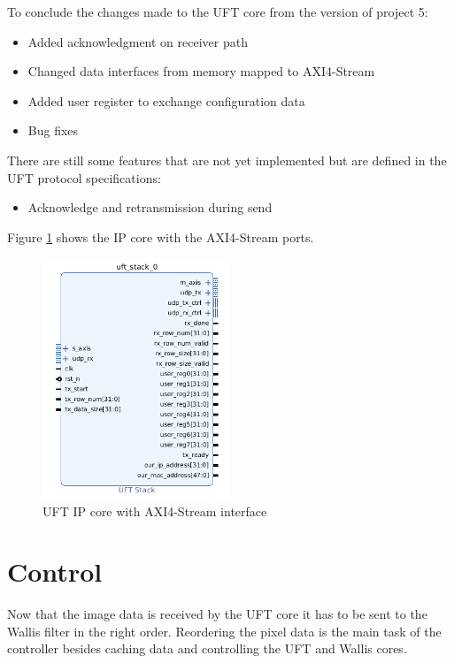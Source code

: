 To conclude the changes made to the UFT core from the version of project 5:
\begin{itemize}
  \item Added acknowledgment on receiver path
  \item Changed data interfaces from memory mapped to AXI4-Stream
  \item Added user register to exchange configuration data
  \item Bug fixes
\end{itemize}

There are still some features that are not yet implemented but are defined in
the UFT protocol specifications:
\begin{itemize}
  \item Acknowledge and retransmission during send
\end{itemize}

Figure \ref{fig:uftipcoreaxistream} shows the IP core with the AXI4-Stream
ports.

\begin{figure}[b!]
    \centering
    \includegraphics[width=0.5\textwidth] {images/dataflow/uftcorestream.png}
    \caption{UFT IP core with AXI4-Stream interface}
    \label{fig:uftipcoreaxistream}
\end{figure}
\section{Control} \label{ch:control}
Now that the image data is received by the UFT core it has to be sent to the
Wallis filter in the right order. Reordering the pixel data is the main task of
the controller besides caching data and controlling the UFT and Wallis cores. 

